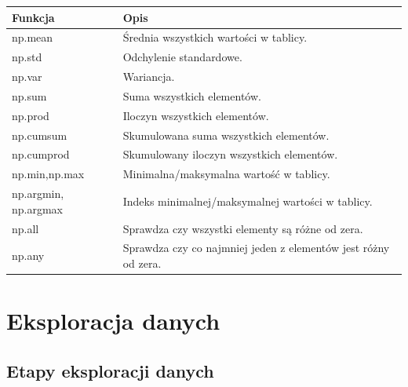 \documentclass[
  polish,
  letterpaper,
  DIV=11,
  numbers=noendperiod]{scrreprt}
\begin{document}
\begin{longtable}[]{@{}
  >{\raggedright\arraybackslash}p{}
  >{\raggedright\arraybackslash}p{}@{}}
\toprule\noalign{}
\begin{minipage}[b]{\linewidth}\raggedright
Funkcja
\end{minipage} & \begin{minipage}[b]{\linewidth}\raggedright
Opis
\end{minipage} \\
\midrule\noalign{}
\endhead
\bottomrule\noalign{}
\endlastfoot
np.mean & Średnia wszystkich wartości w tablicy. \\
np.std & Odchylenie standardowe. \\
np.var & Wariancja. \\
np.sum & Suma wszystkich elementów. \\
np.prod & Iloczyn wszystkich elementów. \\
np.cumsum & Skumulowana suma wszystkich elementów. \\
np.cumprod & Skumulowany iloczyn wszystkich elementów. \\
np.min,np.max & Minimalna/maksymalna wartość w tablicy. \\
np.argmin, np.argmax & Indeks minimalnej/maksymalnej wartości w
tablicy. \\
np.all & Sprawdza czy wszystki elementy są różne od zera. \\
np.any & Sprawdza czy co najmniej jeden z elementów jest różny od
zera. \\
\end{longtable}

\part{Eksploracja danych}

\chapter{Etapy eksploracji danych}\label{etapy-eksploracji-danych}
\end{document}
